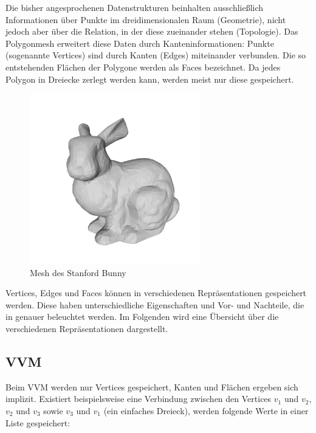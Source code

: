 Die bisher angesprochenen Datenstrukturen beinhalten ausschließlich Informationen über Punkte im dreidimensionalen Raum (Geometrie), nicht jedoch aber über die Relation, in der diese zueinander stehen (Topologie).
Das Polygonmesh erweitert diese Daten durch Kanteninformationen: Punkte (sogenannte Vertices) sind durch Kanten (Edges) miteinander verbunden.
Die so entstehenden Flächen der Polygone werden als Faces bezeichnet.
Da jedes Polygon in Dreiecke zerlegt werden kann, werden meist nur diese gespeichert.

\begin{figure}[ht]
	\centering
	\includegraphics[width=0.66\textwidth, frame]{images/bunny_mesh.png}
	\caption{Mesh des Stanford Bunny \cite{stanfordbunny}}
	\label{fig:bunny_mesh}
\end{figure}

Vertices, Edges und Faces können in verschiedenen Repräsentationen gespeichert werden.
Diese haben unterschiedliche Eigenschaften und Vor- und Nachteile, die in \cite{smith2006vertex} genauer beleuchtet werden.
Im Folgenden wird eine Übersicht über die verschiedenen Repräsentationen dargestellt.

\subsection{\acl{VVM}}
\label{subsec:v-v-mesh}

Beim \ac{VVM} werden nur Vertices gespeichert, Kanten und Flächen ergeben sich implizit.
Existiert beispielsweise eine Verbindung zwischen den Vertices $v_1$ und $v_2$, $v_2$ und $v_3$ sowie $v_3$ und $v_1$ (ein einfaches Dreieck), werden folgende Werte in einer Liste gespeichert:

